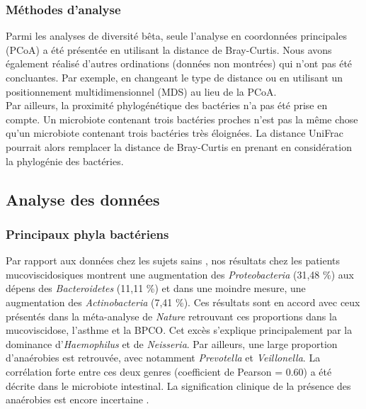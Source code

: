 \documentclass[12pt,a4paper]{article}
\begin{document}
\subsubsection{Méthodes d'analyse}
Parmi les analyses de diversité bêta, seule l'analyse en coordonnées principales (PCoA) a été présentée en utilisant la distance de Bray-Curtis.
Nous avons également réalisé d'autres ordinations (données non montrées) qui n'ont pas été concluantes. Par exemple, en changeant le type de distance ou en utilisant un positionnement multidimensionnel (MDS) au lieu de la PCoA. \\
Par ailleurs, la proximité phylogénétique des bactéries n'a pas été prise en compte. Un microbiote contenant trois bactéries proches n'est pas la même chose qu'un microbiote contenant trois bactéries très éloignées.
La distance UniFrac\cite{Lozupone2005} pourrait alors remplacer la distance de Bray-Curtis en prenant en considération la phylogénie des bactéries.



\subsection{Analyse des données}
\subsubsection{Principaux phyla bactériens}
Par rapport aux données chez les sujets sains \cite{Marsland2014}, nos résultats chez les patients mucoviscidosiques montrent une augmentation des \textit{Proteobacteria} (31,48 \%) aux dépens des \textit{Bacteroidetes} (11,11 \%) et dans une moindre mesure, une augmentation des \textit{Actinobacteria} (7,41 \%). Ces résultats sont en accord avec ceux présentés dans la méta-analyse de \textit{Nature}\cite{Marsland2014} retrouvant ces proportions dans la mucoviscidose, l'asthme et la BPCO. Cet excès s’explique principalement par la dominance d’\textit{Haemophilus} et de \textit{Neisseria}.
Par ailleurs, une large proportion d’anaérobies est retrouvée, avec notamment   \textit{Prevotella} et \textit{Veillonella}. La corrélation forte entre ces deux genres (coefficient de Pearson = 0.60) a été décrite dans le microbiote intestinal\cite{Dlugosz2015}. La signification clinique de la présence des anaérobies est encore incertaine \cite{Tunney2008}.
\end{document}
